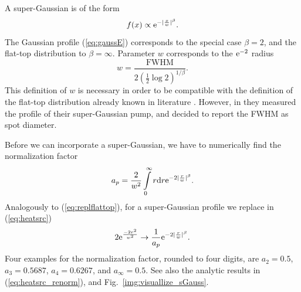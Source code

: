 A super-Gaussian is of the form \cite{Chernikov2010}
\begin{equation}
f(x) \propto \mathrm{e}^{-|\frac{x}{w}|^\beta}.
\label{eq:super-gauss}
\end{equation}
The Gaussian profile (\ref{eq:gaussE})
corresponds to the special case $\beta=2$,
and the flat-top distribution to $\beta=\infty$.
Parameter $w$ corresponds
to the $\mathrm{e}^{-2}$ radius
\begin{equation}
w = \frac{\mathrm{FWHM}}{2(\frac{1}{2}\log2)^{1/\beta}}.
\end{equation}
This definition of $w$ is necessary
in order to be compatible
with the definition
of the flat-top distribution
already known in literature
\cite{Kemp2005}.
However,
in \cite{Heinen2012el}
they measured the profile
of their super-Gaussian pump,
and decided to report
the FWHM
as spot diameter.

Before we can incorporate a super-Gaussian,
we have to numerically find the normalization factor
\begin{equation}
a_p = \frac{2}{w^2} \int\limits_0^\infty r \mathrm{d} r \mathrm{e}^{-2|\frac{r}{w}|^\beta}.
\label{eq:super-gauss-scaling}
\end{equation}
Analogously to (\ref{eq:replflattop}),
for a super-Gaussian profile
we replace in (\ref{eq:heatsrc})
\begin{equation}
2\mathrm{e}^\frac{-2r^2}{w^2} \to \frac{1}{a_p}\mathrm{e}^{-2|\frac{r}{w}|^\beta}.
\label{eq:replsupergauss}
\end{equation}
Four examples for the normalization factor,
rounded to four digits, are
$a_{2}=0.5$,
$a_{3}=0.5687$,
$a_{4}=0.6267$,
and $a_\infty=0.5$.
See also
the analytic results in (\ref{eq:heatsrc_renorm}),
and Fig.~\ref{img:visuallize_sGauss}.

